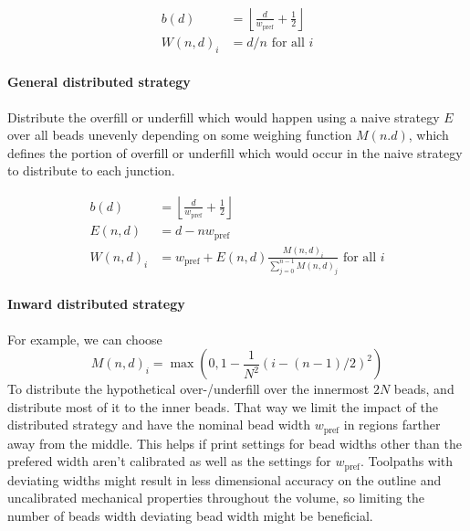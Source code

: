 \begin{align*}
b(d) &= \left\lfloor \frac{d}{ w_\text{pref}} + \frac12 \right\rfloor \\
W(n,d)_i &= d / n \text{ for all } i 
\end{align*}


\paragraph{General distributed strategy}
Distribute the overfill or underfill which would happen using a naive strategy $E$ over all beads unevenly depending on some weighing function $M(n.d)$, which defines the portion of overfill or underfill which would occur in the naive strategy to distribute to each junction.


\begin{align*}
b(d) &= \left\lfloor \frac{d}{ w_\text{pref}} + \frac12 \right\rfloor \\
E(n,d) &= d - n w_\text{pref} \\
W(n,d)_i &= w_\text{pref} + E(n,d) \frac{M(n,d)_i}{\sum_{j=0}^{n-1} M(n,d)_j} \text{ for all } i 
\end{align*}



\paragraph{Inward distributed strategy}
For example, we can choose 
$$M(n,d)_i = \max(0, 1 - \frac{1}{N^2} (i - (n-1)/2)^2 )$$
To distribute the hypothetical over-/underfill over the innermost $2N$ beads, and distribute most of it to the inner beads.
That way we limit the impact of the distributed strategy and have the nominal bead width $w_\text{pref}$ in regions farther away from the middle.
This helps if print settings for bead widths other than the prefered width aren't calibrated as well as the settings for $w_\text{pref}$.
Toolpaths with deviating widths might result in less dimensional accuracy on the outline and uncalibrated mechanical properties throughout the volume, so limiting the number of beads width deviating bead width might be beneficial.






